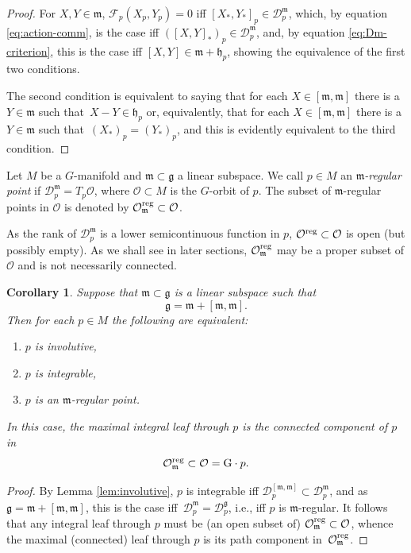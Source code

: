 \documentclass[pdftex]{sigma}
\numberwithin{equation}{section}
\newtheorem{Corollary}[Theorem]{Corollary}
\newcommand{\be}{\begin{equation}}
\newcommand{\ee}{\end{equation}}
\newcommand{\ocal}{\mathcal{O}}
\newcommand{\dcal}{\mathcal{D}}
\newcommand{\m}{\mathfrak{m}}
\newcommand{\G}{\mathrm{G}}
\newcommand{\g}{{\mathfrak{g}}}
\newcommand{\h}{{\mathfrak h}}
\renewcommand{\m}{{\mathfrak m}}
\begin{document}
\begin{proof}
For $X, Y \in \m$, ${\mathcal F}_p(X_p, Y_p) = 0$ iff $[X_\ast, Y_\ast]_p \in \dcal^\m_p$, which, by equation \eqref{eq:action-comm}, is the case iff $([X, Y]_\ast)_p \in \dcal^\m_p$, and, by equation \eqref{eq:Dm-criterion}, this is the case iff $[X,Y] \in \m + \h_p$, showing the equivalence of the first two conditions.

The second condition is equivalent to saying that for each $X \in [\m,\m]$ there is a $Y \in \m$ such that~$X - Y \in \h_p$ or, equivalently, that for each $X \in [\m,\m]$ there is a $Y \in \m$ such that~$(X_\ast)_p = (Y_\ast)_p$, and this is evidently equivalent to the third condition.
\end{proof}


\begin{Definition} \label{def:regular}
Let $M$ be a $G$-manifold and $\m \subset \g$ a linear subspace. We call $p \in M$ an {\em $\m$-regular point} if $\dcal^\m_p = T_p\ocal$, where $\ocal \subset M$ is the $G$-orbit of $p$. The subset of $\m$-regular points in $\ocal$ is denoted by
$\ocal^{\rm reg}_{\m} \subset \ocal$.
\end{Definition}

As the rank of $\dcal^\m_p$ is a lower semicontinuous function in $p$, $\ocal^{\rm reg} \subset \ocal$ is open (but possibly empty).
As we shall see in later sections, $\ocal^{\rm reg}_{\m}$ may be a proper subset of $\ocal$ and is not necessarily connected.

\begin{Corollary} \label{cor:integrable}
Suppose that $\m \subset \g$ is a linear subspace such that
\be \label{eq:condition-integrable}
\g = \m + [\m,\m].
\ee
Then for each $p \in M$ the following are equivalent:
\begin{enumerate}\itemsep=0pt
\item[$(1)$] $p$ is involutive,
\item[$(2)$] $p$ is integrable,
\item[$(3)$] $p$ is an $\m$-regular point.
\end{enumerate}
In this case, the maximal integral leaf through $p$ is the connected component of $p$ in
\[
\ocal^{\rm reg}_{\m}  \subset \ocal  =  \G \cdot p.
\]
\end{Corollary}

\begin{proof}
By Lemma \ref{lem:involutive}, $p$ is integrable iff $\dcal^{[\m, \m]}_p \subset \dcal^\m_p$, and as $\g = \m + [\m,\m]$, this is the case iff~$\dcal^\m_p = \dcal^\g_p$, i.e., iff $p$ is $\m$-regular. It follows that any integral leaf through $p$ must be (an open subset of) $\ocal^{\rm reg}_{\m} \subset \ocal$, whence the maximal (connected) leaf through $p$ is its path component in~$\ocal^{\rm reg}_{\m}$.
\end{proof}
\end{document}
